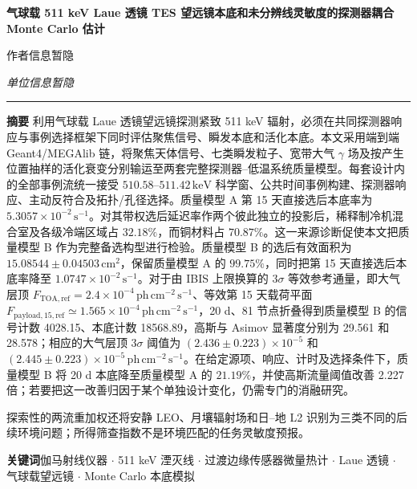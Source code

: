 \documentclass[11pt]{article}
\newcommand{\keV}{\,\mathrm{keV}}
\newcommand{\phcms}{\,\mathrm{ph\,cm^{-2}\,s^{-1}}}
\newcommand{\cps}{\,\mathrm{s^{-1}}}
\newcommand{\ftoaref}{F_{\mathrm{TOA,ref}}}
\newcommand{\fpayloadref}{F_{\mathrm{payload,15,ref}}}
\begin{document}
\thispagestyle{fancy}
\begin{flushleft}
{\LARGE\bfseries 气球载 511 keV Laue 透镜 TES 望远镜本底和未分辨线灵敏度的探测器耦合 Monte Carlo 估计 \par}
\vspace{1.1em}
{\large 作者信息暂隐\par}
\vspace{0.3em}
{\normalsize\itshape 单位信息暂隐\par}
\end{flushleft}
\vspace{0.7em}
\noindent\rule{\textwidth}{0.4pt}
\vspace{0.5em}

\noindent\textbf{摘要}\hspace{0.7em}
利用气球载 Laue 透镜望远镜探测紧致 511 keV 辐射，必须在共同探测器响应与事例选择框架下同时评估聚焦信号、瞬发本底和活化本底。本文采用端到端 Geant4/MEGAlib 链，将聚焦天体信号、七类瞬发粒子、宽带大气 $\gamma$ 场及按产生位置抽样的活化衰变分别输运至两套完整探测器--低温系统质量模型。每套设计内的全部事例流统一接受 $510.58$--$511.42\keV$ 科学窗、公共时间事例构建、探测器响应、主动反符合及拓扑/孔径选择。质量模型 A 第 15 天直接选后本底率为 $5.3057\times10^{-2}\cps$。对其带权选后延迟率作两个彼此独立的投影后，稀释制冷机混合室及各级冷端区域占 $32.18\%$，而铜材料占 $70.87\%$。这一来源诊断促使本文把质量模型 B 作为完整备选构型进行检验。质量模型 B 的选后有效面积为 $15.08544\pm0.04503\,\mathrm{cm^2}$，保留质量模型 A 的 $99.75\%$，同时把第 15 天直接选后本底率降至 $1.0747\times10^{-2}\cps$。对于由 IBIS 上限换算的 $3\sigma$ 等效参考通量，即大气层顶 $\ftoaref=2.4\times10^{-4}\phcms$、等效第 15 天载荷平面 $\fpayloadref\simeq1.565\times10^{-4}\phcms$，20 d、81 节点折叠得到质量模型 B 的信号计数 4028.15、本底计数 18568.89，高斯与 Asimov 显著度分别为 29.561 和 28.578；相应的大气层顶 $3\sigma$ 阈值为 $(2.436\pm0.223)\times10^{-5}$ 和 $(2.445\pm0.223)\times10^{-5}\phcms$。在给定源项、响应、计时及选择条件下，质量模型 B 将 20 d 本底降至质量模型 A 的 $21.19\%$，并使高斯流量阈值改善 2.227 倍；若要把这一改善归因于某个单独设计变化，仍需专门的消融研究。

探索性的两流重加权还将安静 LEO、月壤辐射场和日--地 L2 识别为三类不同的后续环境问题；所得筛查指数不是环境匹配的任务灵敏度预报。

\vspace{0.7em}
\noindent\textbf{关键词}\hspace{0.7em}伽马射线仪器 $\cdot$ 511 keV 湮灭线 $\cdot$ 过渡边缘传感器微量热计 $\cdot$ Laue 透镜 $\cdot$ 气球载望远镜 $\cdot$ Monte Carlo 本底模拟
\end{document}

